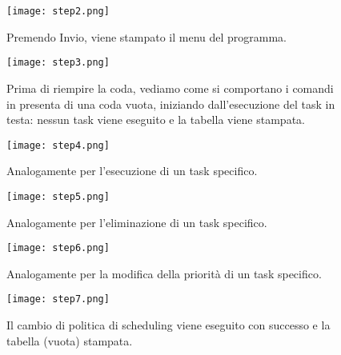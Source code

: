        	\begin{figure}[h!]
       		\begin{center}
       			\texttt{[image: step2.png]}
       		\end{center}
       		\caption{Premendo Invio, viene stampato il menu del programma.}
       		\label{fig:step2}
       	\end{figure}
       	
       	\begin{figure}[h!]
       		\begin{center}
       			\texttt{[image: step3.png]}
       		\end{center}
       		\caption{Prima di riempire la coda, vediamo come si comportano i comandi in presenta di una coda vuota, iniziando dall'esecuzione del task in testa: nessun task viene eseguito e la tabella viene stampata.}
       		\label{fig:step3}
       	\end{figure}
       	
       	\begin{figure}[h!]
       		\begin{center}
       			\texttt{[image: step4.png]}
       		\end{center}
       		\caption{Analogamente per l'esecuzione di un task specifico.}
       		\label{fig:step4}
       	\end{figure}
       	
       	\begin{figure}[h!]
       		\begin{center}
       			\texttt{[image: step5.png]}
       		\end{center}
       		\caption{Analogamente per l'eliminazione di un task specifico.}
       		\label{fig:step5}
       	\end{figure}
       	
       	\begin{figure}[h!]
       		\begin{center}
       			\texttt{[image: step6.png]}
       		\end{center}
       		\caption{Analogamente per la modifica della priorità di un task specifico.}
       		\label{fig:step6}
       	\end{figure}
       	
       	\begin{figure}[h!]
       		\begin{center}
       			\texttt{[image: step7.png]}
       		\end{center}
       		\caption{Il cambio di politica di scheduling viene eseguito con successo e la tabella (vuota) stampata.}
       		\label{fig:step7}
       	\end{figure}
       	
